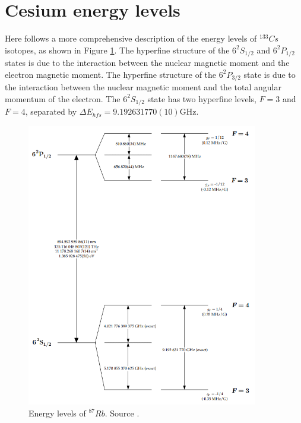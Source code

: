 \pagebreak
\section{Cesium energy levels}
\label{appendix:Cesium-energy-levels}

Here follows a more comprehensive description of the energy levels of $^{133}Cs$ isotopes, as shown in Figure \ref{fig:Cesium-energy-levels}.
The hyperfine structure of the $6^2S_{1/2}$ and $6^2P_{1/2}$ states is due to the interaction between the nuclear magnetic moment and the electron magnetic moment.
The hyperfine structure of the $6^2P_{3/2}$ state is due to the interaction between the nuclear magnetic moment and the total angular momentum of the electron.
The $6^2S_{1/2}$ state has two hyperfine levels, $F=3$ and $F=4$, separated by $\Delta E_{hfs} = 9.192631770(10) \text{GHz}$.

\begin{figure}[H]
    \centering
    \includegraphics[width=0.9\textwidth, max width=\linewidth]{img/levels-Caesium.png}
    \caption{Energy levels of $^{87}Rb$. Source \cite{ALKALINI}.}
    \label{fig:Cesium-energy-levels}
\end{figure}


